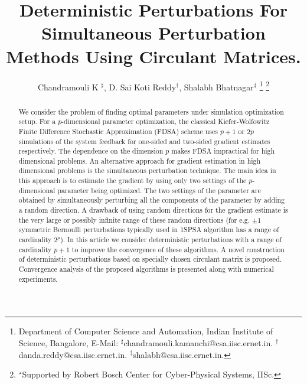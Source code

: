 \documentclass[letterpaper, 10 pt, conference]{ieeeconf}  %
\title{\LARGE \bf
 Deterministic Perturbations For Simultaneous Perturbation Methods Using
 Circulant Matrices.
}
\author{Chandramouli K $^\sharp$, D. Sai Koti Reddy$^\dagger$, Shalabh Bhatnagar$^\ddag$
\thanks{
Department of Computer Science and Automation,
Indian Institute of Science, Bangalore,
E-Mail: $^\sharp$chandramouli.kamanchi@csa.iisc.ernet.in.
$^\dagger$danda.reddy@csa.iisc.ernet.in.
$^\ddag$shalabh@csa.iisc.ernet.in.}
\thanks{$^\star$Supported by Robert Bosch Center for Cyber-Physical Systems, IISc.}
}
\begin{document}
% 
% 
\maketitle
% 
% 
\begin{abstract}
We consider the problem of finding optimal parameters under simulation optimization setup.
For a $p$-dimensional parameter optimization, the classical Kiefer-Wolfowitz Finite Difference Stochastic 
Approximation (FDSA) scheme uses $p+1$ or $2p$ simulations of the system feedback for one-sided 
and two-sided gradient estimates respectively.
The dependence on the dimension $p$ makes FDSA impractical for high dimensional problems.
An alternative approach for gradient estimation in high dimensional problems is the 
simultaneous perturbation technique.
The main idea in this approach is to estimate the gradient by using only two settings of 
the $p$-dimensional parameter being optimized. 
The two settings of the parameter are obtained by
simultaneously perturbing all the components of the parameter by adding a random 
direction. A drawback of using random directions for the gradient estimate is the very large
or possibly infinite range of these random directions (for e.g. $\pm 1$ symmetric 
Bernoulli perturbations typically used in 1SPSA algorithm has a range of cardinality $2^p$).
In this article we consider deterministic perturbations with a range of cardinality
$p+1$ to improve the convergence of these algorithms. A novel construction of deterministic perturbations 
based on specially chosen circulant matrix is proposed. Convergence analysis of the proposed
algorithms is presented along with numerical experiments. 
\end{abstract}
\end{document}
